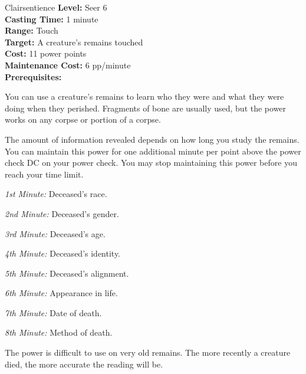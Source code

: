 {Clairsentience}
{
	\textbf{Level:}
	Seer 6\\
	\textbf{Casting Time:}
	1 minute\\
	\textbf{Range:}
	Touch\\
	\textbf{Target:}
	A creature's remains touched\\
	\textbf{Cost:}
	11 power points\\
	\textbf{Maintenance Cost:}
	6 pp/minute\\
	\textbf{Prerequisites:}
	\\
}
{
	You can use a creature's remains to learn who they were and what they were doing when they perished. Fragments of bone are usually used, but the power works on any corpse or portion of a corpse.

	The amount of information revealed depends on how long you study the remains. You can maintain this power for one additional minute per point above the power check DC on your power check. You may stop maintaining this power before you reach your time limit.

	\textit{1st Minute:} Deceased's race.

	\textit{2nd Minute:} Deceased's gender.

	\textit{3rd Minute:} Deceased's age.

	\textit{4th Minute:} Deceased's identity.

	\textit{5th Minute:} Deceased's alignment.

	\textit{6th Minute:} Appearance in life.

	\textit{7th Minute:} Date of death.

	\textit{8th Minute:} Method of death.

	The power is difficult to use on very old remains. The more recently a creature died, the more accurate the reading will be.

}